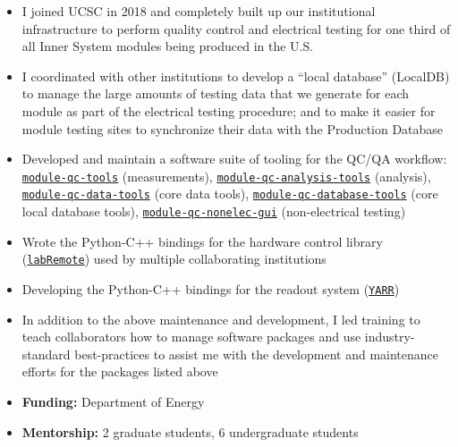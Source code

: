 \begin{itemize}
	\setlength{\itemsep}{0em}
	\item I joined UCSC in 2018 and completely built up our institutional infrastructure to perform quality control and electrical testing for one third of all Inner System modules being produced in the U.S.
	\item I coordinated with other institutions to develop a \enquote{local database} (LocalDB) to manage the large amounts of testing data that we generate for each module as part of the electrical testing procedure; and to make it easier for module testing sites to synchronize their data with the Production Database
	\item Developed and maintain a software suite of tooling for the QC/QA workflow: \href{https://pypi.org/project/module-qc-tools/}{\texttt{module-qc-tools}} (measurements), \href{https://pypi.org/project/module-qc-analysis-tools/}{\texttt{module-qc-analysis-tools}} (analysis), \href{https://pypi.org/project/module-qc-data-tools/}{\texttt{module-qc-data-tools}} (core data tools), \href{https://pypi.org/project/module-qc-database-tools/}{\texttt{module-qc-database-tools}} (core local database tools), \href{https://pypi.org/project/module-qc-nonelec-gui/}{\texttt{module-qc-nonelec-gui}} (non-electrical testing)
	\item Wrote the Python-C++ bindings for the hardware control library (\href{https://gitlab.cern.ch/berkeleylab/labRemote/}{\texttt{labRemote}}) used by multiple collaborating institutions
	\item Developing the Python-C++ bindings for the readout system (\href{https://yarr.web.cern.ch}{\texttt{YARR}})
	\item In addition to the above maintenance and development, I led training to teach collaborators how to manage software packages and use industry-standard best-practices to assist me with the development and maintenance efforts for the packages listed above
	\item \textbf{Funding:} Department of Energy
	\item \textbf{Mentorship:} 2 graduate students, 6 undergraduate students
\end{itemize}

\\

